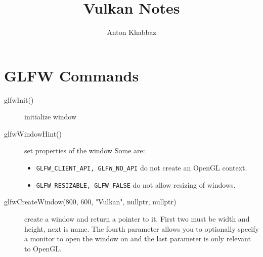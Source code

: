 \documentclass{article}
\title{Vulkan Notes}
\author{Anton Khabbaz}
\begin{document}
\maketitle
\section{GLFW Commands}
\begin{description}
\item[ glfwInit()] initialize window
\item[glfwWindowHint()] set properties of the window Some are:
	\begin{itemize}
		\item \verb|GLFW_CLIENT_API, GLFW_NO_API| do not create an
OpenGL context.
		\item \verb|GLFW_RESIZABLE, GLFW_FALSE| do not allow resizing of
windows.
	\end{itemize}
\item [glfwCreateWindow(800, 600, "Vulkan", nullptr, nullptr)] create a window
and return a pointer to it.  First two must be width and height, next is name.
The fourth parameter allows you to optionally specify a monitor to open the
window on and the last parameter is only relevant to OpenGL.	
\end{description}
\end{document}
